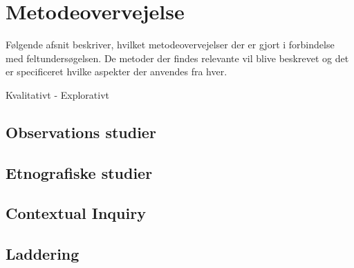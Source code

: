 \section{Metodeovervejelse}
\label{ParametreMetodeovervejelser}
%
Følgende afsnit beskriver, hvilket metodeovervejelser der er gjort i forbindelse med feltundersøgelsen. De metoder der findes relevante vil blive beskrevet og det er specificeret hvilke aspekter der anvendes fra hver. \blankline
%

Kvalitativt - Explorativt 
% 

\subsection{Observations studier}

\subsection{Etnografiske studier}

\subsection{Contextual Inquiry}

\subsection{Laddering}